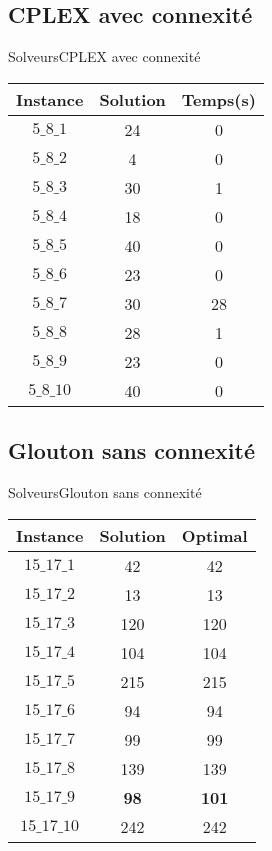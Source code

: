 \documentclass[10pt]{beamer}
\begin{document}
\subsection{CPLEX avec connexité}
\begin{frame}{Solveurs}{CPLEX avec connexité}
\begin{center}
    \begin{tabular}{|c|c|c|}
      \hline 
      Instance & Solution & Temps(s) \\ \hline
      $5\_8\_1$ & 24 & 0 \\ \hline
      $5\_8\_2$ & 4 & 0 \\ \hline
      $5\_8\_3$ & 30 & 1 \\ \hline
      $5\_8\_4$ & 18 & 0 \\ \hline
      $5\_8\_5$ & 40 & 0 \\ \hline
      $5\_8\_6$ & 23 & 0 \\ \hline
      $5\_8\_7$ & 30 & 28 \\ \hline
      $5\_8\_8$ & 28 & 1 \\ \hline
      $5\_8\_9$ & 23 & 0 \\ \hline
      $5\_8\_10$  & 40 & 0 \\ \hline
      \end{tabular}
      \end{center}
\end{frame}

\subsection{Glouton sans connexité}
\begin{frame}{Solveurs}{Glouton sans connexité}
\begin{center}
      \begin{tabular}{|c|c|c|}
      \hline 
        Instance & Solution & Optimal  \\ \hline
        $15\_17\_1$ & 42  & 42  \\ \hline
        $15\_17\_2$ & 13  & 13  \\ \hline
        $15\_17\_3$ & 120  & 120  \\ \hline
        $15\_17\_4$ & 104  & 104  \\ \hline
        $15\_17\_5$ & 215  & 215  \\ \hline
        $15\_17\_6$ & 94  & 94  \\ \hline
        $15\_17\_7$ & 99  & 99  \\ \hline
        $15\_17\_8$ & 139  & 139  \\ \hline
        $15\_17\_9$ & \textbf{98}  & \textbf{101}  \\ \hline
        $15\_17\_10$ & 242 & 242  \\ \hline
      \end{tabular}
      \end{center}
\end{frame}
\end{document}
